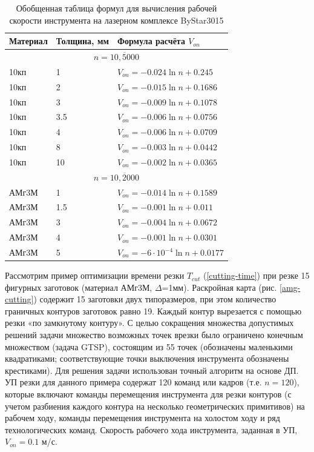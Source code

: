 \documentclass[12pt]{report}
\begin{document}
\begin{table}
  \caption{Обобщенная таблица формул для вычисления рабочей скорости инструмента на лазерном комплексе ByStar3015}
  \label{v-formulae}
  \begin{tabular}{lll}
    \hline
    Материал & Толщина, мм & Формула расчёта $V_{on}$ \\
    \hline
    \multicolumn{3}{c}{$n=\overline{10,5000}$} \\
    10кп & 1 & $V_{on} = -0.024 \ln n+0.245$ \\
    10кп & 2 & $V_{on} = -0.015 \ln n+0.1686$ \\
    10кп & 3 & $V_{on} = -0.009 \ln n+0.1078$ \\
    10кп & 3.5 & $V_{on} = -0.006 \ln n+0.0756$ \\
    10кп & 4 & $V_{on} = -0.006 \ln n+0.0709$ \\
    10кп & 8 & $V_{on} = -0.003 \ln n+0.0442$ \\
    10кп & 10 & $V_{on} = -0.002 \ln n+0.0365$ \\
    \multicolumn{3}{c}{$n=\overline{10,2000}$} \\
    АМг3М & 1 & $V_{on} = -0.014 \ln n+0.1589$ \\
    АМг3М & 1.5 & $V_{on} = -0.001 \ln n+0.011$ \\
    АМг3М & 3 & $V_{on} = -0.004 \ln n+0.0672$ \\
    АМг3М & 4 & $V_{on} = -0.001 \ln n+0.0301$ \\
    АМг3М & 5 & $V_{on} = -6\cdot 10^{-4} \ln n+0.0177$ \\
  \end{tabular}
\end{table}

Рассмотрим пример оптимизации времени резки
$T_{cut}$
(\ref{cutting-time})
при резке 15 фигурных заготовок
(материал АМг3М, $\Delta$=1мм).
Раскройная карта (рис. \ref{amg-cutting})
содержит 15 заготовки двух типоразмеров,
при этом количество граничных контуров заготовок равно 19.
Каждый контур вырезается с помощью резки
«по замкнутому контуру».
С целью сокращения множества допустимых решений
задачи множество возможных точек врезки было
ограничено конечным множеством (задача GTSP),
состоящим из 55 точек
(обозначены маленькими квадратиками;
соответствующие точки выключения инструмента обозначены крестиками).
Для решения задачи использован точный алгоритм на основе ДП.
УП резки для данного примера содержат 120 команд или кадров
(т.е. $n=120$),
которые включают команды перемещения инструмента
для резки контуров
(с учетом разбиения каждого контура на несколько геометрических примитивов)
на рабочем ходу,
команды перемещения инструмента на холостом ходу
и ряд технологических команд.
Скорость рабочего хода инструмента, заданная в УП,
$V_{on}=0.1$ м/с.
\end{document}

